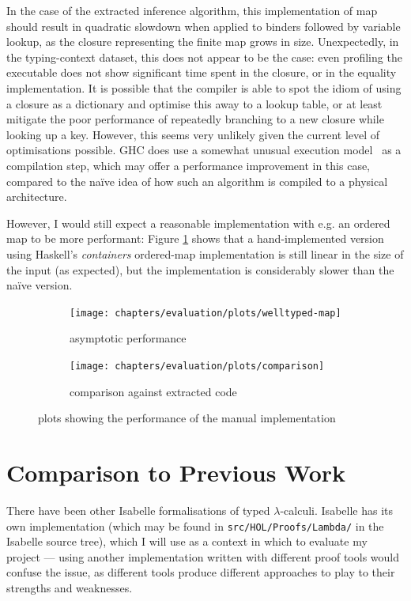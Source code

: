 In the case of the extracted inference algorithm, this implementation of map should result in quadratic slowdown when applied to binders followed by variable lookup, as the closure representing the finite map grows in size.
Unexpectedly, in the typing-context dataset, this does not appear to be the case: even profiling the executable does not show significant time spent in the closure, or in the equality implementation.
It is possible that the compiler is able to spot the idiom of using a closure as a dictionary and optimise this away to a lookup table, or at least mitigate the poor performance of repeatedly branching to a new closure while looking up a key.
However, this seems very unlikely given the current level of optimisations possible.
GHC does use a somewhat unusual execution model~\cite{STG} as a compilation step, which may offer a performance improvement in this case, compared to the na\"ive idea of how such an algorithm is compiled to a physical architecture.

However, I would still expect a reasonable implementation with e.g. an ordered map to be more performant: Figure \ref{fig:results-map} shows that a hand-implemented version using Haskell's \emph{containers} ordered-map implementation is still linear in the size of the input (as expected), but the implementation is considerably slower than the na\"ive version.

\begin{figure}
\begin{subfigure}{.49\textwidth}
 \centering
 \texttt{[image: chapters/evaluation/plots/welltyped-map]}
 \caption{asymptotic performance}
\end{subfigure}
\begin{subfigure}{.49\textwidth}
 \centering
 \texttt{[image: chapters/evaluation/plots/comparison]}
 \caption{comparison against extracted code}
\end{subfigure}
\caption{plots showing the performance of the manual implementation}
\label{fig:results-map}
\end{figure}

\section{Comparison to Previous Work}
There have been other Isabelle formalisations of typed \(\lambda\)-calculi.
Isabelle has its own implementation (which may be found in \texttt{src/HOL/Proofs/Lambda/} in the Isabelle source tree), which I will use as a context in which to evaluate my project --- using another implementation written with different proof tools would confuse the issue, as different tools produce different approaches to play to their strengths and weaknesses.

